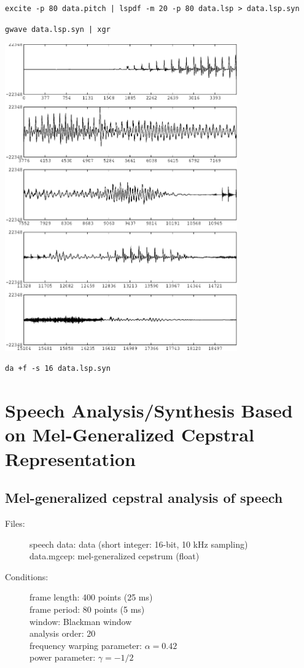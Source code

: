 \documentclass[a4paper,10pt]{article}
\begin{document}
\begin{verbatim}
excite -p 80 data.pitch | lspdf -m 20 -p 80 data.lsp > data.lsp.syn
\end{verbatim}

\begin{verbatim}
gwave data.lsp.syn | xgr
\end{verbatim}

\includegraphics[width=10cm]{data.lsp.syn.gwave.eps}

\begin{verbatim}
da +f -s 16 data.lsp.syn
\end{verbatim}

\section{Speech Analysis/Synthesis 
        Based on Mel-Generalized Cepstral Representation}

\subsection{Mel-generalized cepstral analysis of speech}

\begin{description}
\item[Files:]
   speech data: data (short integer: 16-bit, 10 kHz sampling)\\
   data.mgcep: mel-generalized cepstrum (float)
\item[Conditions:]
  frame length: 400 points (25 ms)\\
  frame period: 80 points (5 ms)\\
  window: Blackman window\\
  analysis order: 20\\
  frequency warping parameter: $\alpha = 0.42$\\
  power parameter:     $\gamma = -1/2$
\end{description}
\end{document}
